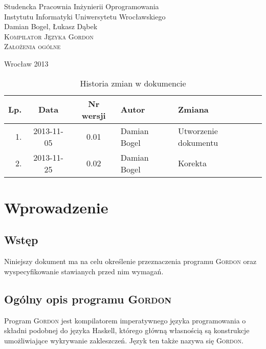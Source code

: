 \documentclass{documentation}
\begin{document}
\begin{titlepage}
\begin{center}
Studencka Pracownia Inżynierii Oprogramowania\\
Instytutu Informatyki Uniwersytetu Wrocławskiego\\[6cm]

Damian Bogel, Łukasz Dąbek\\[1cm]
\textsc{\LARGE Kompilator Języka Gordon}\\[0.5cm]
\textsc{\large Założenia ogólne}

\vfill
Wrocław 2013 \\[2.5cm]

\end{center}
\end{titlepage}

\newpage
\begin{table}
	\centering
    \captionsetup{name=Tabela,labelsep=period}
	\caption{Historia zmian w dokumencie}
		\begin{tabular}{|r|c|c|l|l|}
		\hline
		Lp.  & Data       & Nr wersji & Autor                 & Zmiana \\ \hline
		1.   & 2013-11-05 & 0.01 & Damian Bogel & Utworzenie dokumentu \\ \hline
		2.   & 2013-11-25 & 0.02 & Damian Bogel & Korekta \\ \hline
	\end{tabular}
\end{table}
\newpage

\tableofcontents
\setcounter{page}{2}

\newpage

\section{Wprowadzenie}
\subsection{Wstęp}
\noindent Niniejszy dokument ma na celu określenie przeznaczenia programu
\textsc{Gordon} oraz wyspecyfikowanie stawianych przed nim wymagań.

\subsection{Ogólny opis programu \textsc{Gordon}}
\noindent Program \textsc{Gordon} jest kompilatorem imperatywnego języka
programowania o składni podobnej do języka Haskell, którego główną własnością
są konstrukcje umożliwiające wykrywanie zakleszczeń. Język ten także nazywa się
\textsc{Gordon}.
\end{document}
